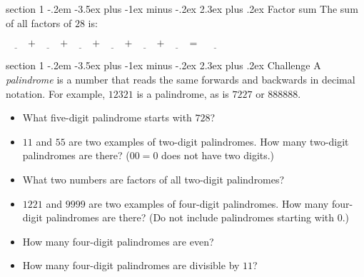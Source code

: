 \documentclass[12pt,letterpaper]{article}
\makeatletter
\newenvironment{problem}{\@startsection
       {section}
       {1}
       {-.2em}
       {-3.5ex plus -1ex minus -.2ex}
       {2.3ex plus .2ex}
       {\pagebreak[3]
       \large\bf\noindent{Problem }
       }
       }
\makeatother
\begin{document}
\begin{problem}{Factor sum}
 The sum of all factors of $28$ is:
 
 $\underline{\hspace{2em}} + 
 \underline{\hspace{2em}} + 
 \underline{\hspace{2em}} + 
 \underline{\hspace{2em}} + 
 \underline{\hspace{2em}} + 
 \underline{\hspace{2em}} = \underline{\hspace{3em}}$
\end{problem}


\begin{problem}{Challenge}
A \emph{palindrome} is a number that reads the same forwards and backwards
in decimal notation.
For example, $12321$ is a palindrome, as is $7227$ or $888888$.

\begin{itemize}
 \item What five-digit palindrome starts with $728$? \underline{\hspace{5em}}
 \item $11$ and $55$ are two examples of two-digit palindromes.
 How many two-digit palindromes are there? ($00=0$ does not have two digits.)
 \item What two numbers are factors of all two-digit palindromes?
 \item $1221$ and $9999$ are two examples of four-digit palindromes.
 How many four-digit palindromes are there? (Do not include palindromes starting
 with $0$.)
 \item How many four-digit palindromes are even?
 \item How many four-digit palindromes are divisible by $11$?
\end{itemize}


\end{problem}
\end{document}
